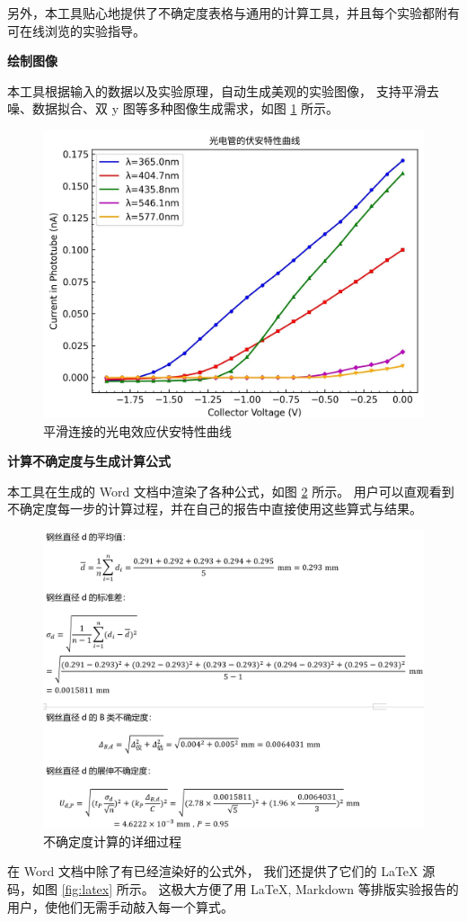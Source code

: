 另外，本工具贴心地提供了不确定度表格与通用的计算工具，并且每个实验都附有可在线浏览的实验指导。

{\noindent\bfseries\textbullet{}绘制图像}

本工具根据输入的数据以及实验原理，自动生成美观的实验图像，
支持平滑去噪、数据拟合、双 y 图等多种图像生成需求，如图 \ref{fig:draw} 所示。

\begin{figure}[p]
  \centering
  \includegraphics[width=0.67\columnwidth]{figure/draw.jpg}
  \caption{平滑连接的光电效应伏安特性曲线}
  \label{fig:draw}
\end{figure}

{\noindent\bfseries\textbullet{}计算不确定度与生成计算公式}

本工具在生成的 Word 文档中渲染了各种公式，如图 \ref{fig:calc} 所示。
用户可以直观看到不确定度每一步的计算过程，并在自己的报告中直接使用这些算式与结果。

\begin{figure}[p]
  \centering
  \includegraphics[width=0.67\columnwidth]{figure/calc.png}
  \caption{不确定度计算的详细过程}
  \label{fig:calc}
\end{figure}

在 Word 文档中除了有已经渲染好的公式外，
我们还提供了它们的 \LaTeX{} 源码，如图 \ref{fig:latex} 所示。
这极大方便了用 \LaTeX{}, Markdown 等排版实验报告的用户，使他们无需手动敲入每一个算式。

